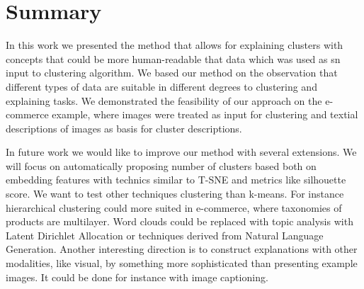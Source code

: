 \documentclass[
 twocolumn,
]{ceurart}
\begin{document}
%


\section{Summary}
\label{sec:summary}
In this work we presented the method that allows for explaining clusters with concepts that could be more human-readable that data which was used as sn input to clustering algorithm.
We based our method on the observation that different types of data are suitable in different degrees to clustering and explaining tasks.
We demonstrated the feasibility of our approach on the e-commerce example, where images were treated as input for clustering and textial descriptions of images as basis for cluster descriptions.


In future work we would like to improve our method with several extensions.
We will focus on automatically proposing number of clusters based both on embedding features with technics similar to T-SNE and metrics like silhouette score.
We want to test other techniques clustering than k-means.
For instance hierarchical clustering could more suited in e-commerce, where taxonomies of products are multilayer.
Word clouds could be replaced with topic analysis with Latent Dirichlet Allocation or techniques derived from Natural Language Generation.
Another interesting direction is to construct explanations with other modalities, like visual, by something more sophisticated than presenting example images.
It could be done for instance with image captioning.
\end{document}
